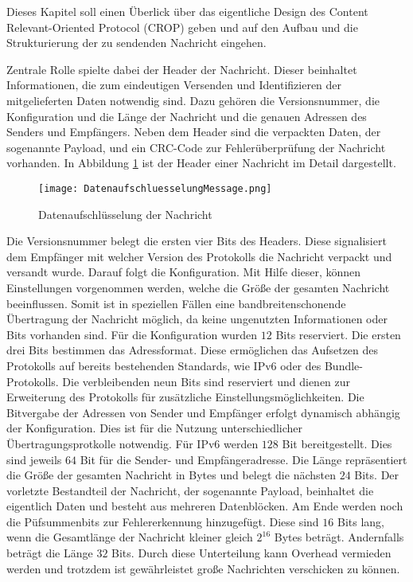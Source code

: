 \label{sec:ProtokolDesign}
Dieses Kapitel soll einen Überlick über das eigentliche Design des Content
Relevant-Oriented Protocol (CROP) geben und auf den Aufbau und die
Strukturierung der zu sendenden Nachricht eingehen.

Zentrale Rolle spielte dabei der Header der Nachricht. Dieser beinhaltet
Informationen, die zum eindeutigen Versenden und Identifizieren der
mitgelieferten Daten notwendig sind. Dazu gehören die Versionsnummer,
die Konfiguration und die Länge der Nachricht und die genauen Adressen
des Senders und Empfängers. Neben dem Header sind die verpackten Daten, der
sogenannte Payload, und ein CRC-Code zur Fehlerüberprüfung der Nachricht
vorhanden. In Abbildung \ref{fig:DatenaufschluesselungMessage} ist der Header
einer Nachricht im Detail dargestellt.

\begin{figure}[H]
	\centering
	\texttt{[image: DatenaufschluesselungMessage.png]}
	\caption{Datenaufschlüsselung der Nachricht}
	\label{fig:DatenaufschluesselungMessage}
\end{figure}

Die Versionsnummer belegt die ersten vier Bits des Headers. Diese
signalisiert dem Empfänger mit welcher Version des Protokolls die Nachricht
verpackt und versandt wurde. Darauf folgt die Konfiguration. Mit Hilfe dieser,
können Einstellungen vorgenommen werden, welche die Größe der gesamten Nachricht
beeinflussen. Somit ist in speziellen Fällen eine bandbreitenschonende
Übertragung der Nachricht möglich, da keine ungenutzten Informationen oder Bits
vorhanden sind. Für die Konfiguration wurden $12$ Bits reserviert. Die ersten drei Bits
bestimmen das Adressformat. Diese ermöglichen das Aufsetzen des Protokolls auf
bereits bestehenden Standards, wie IPv6 oder des Bundle-Protokolls.
Die verbleibenden neun Bits sind reserviert und dienen zur Erweiterung des
Protokolls für zusätzliche Einstellungsmöglichkeiten. Die Bitvergabe
der Adressen von Sender und Empfänger erfolgt dynamisch abhängig der
Konfiguration.
Dies ist für die Nutzung unterschiedlicher Übertragungsprotkolle notwendig.
Für IPv6 werden $128$ Bit bereitgestellt. Dies sind jeweils $64$ Bit für
die Sender- und Empfängeradresse. Die Länge repräsentiert die Größe der gesamten
Nachricht in Bytes und belegt die nächsten $24$ Bits.
Der vorletzte Bestandteil der Nachricht, der sogenannte Payload, beinhaltet die
eigentlich Daten und besteht aus mehreren Datenblöcken. Am Ende werden noch
die Püfsummenbits zur Fehlererkennung hinzugefügt. Diese sind $16$ Bits lang,
wenn die Gesamtlänge der Nachricht kleiner gleich $2^{16}$ Bytes beträgt.
Andernfalls beträgt die Länge $32$ Bits. Durch diese Unterteilung kann
Overhead vermieden werden und trotzdem ist gewährleistet große Nachrichten
verschicken zu können.

